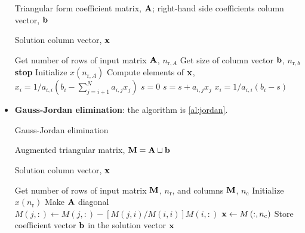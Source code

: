 \begin{itemize}
\begin{algorithm}
\begin{algorithmic}[1]
                \Input Triangular form coefficient matrix, $\boldsymbol{\mathrm{A}}$;
                right-hand side coefficients column vector, $\boldsymbol{\mathrm{b}}$

                \Output Solution column vector, $\boldsymbol{\mathrm{x}}$

                \State Get number of rows of input matrix $\boldsymbol{\mathrm{A}}$, $n_{\text{r},A}$ 
                \State Get size of column vector $\boldsymbol{\mathrm{b}}$, $n_{\text{r},b}$ 
                    \textbf{stop}
                \EndIf
                \State Initialize $x\left( n_{\text{r},A} \right)$
                    \Comment Compute elements of $\boldsymbol{\mathrm{x}}$, $x_i = 1/a_{i,i} \left( b_i - \sum_{j=i+1}^N a_{i,j} x_j \right)$
                    \State $s = 0$
                        \State  $s = s + a_{i,j} x_j$
                    \EndFor
                    \State  $x_i = 1/a_{i,i} \left( b_i - s \right)$
                \EndFor
                \EndProcedure
            \end{algorithmic}
        \end{algorithm}

    \item \textbf{Gauss-Jordan elimination}: the algorithm is \cref{al:jordan}.
        \begin{algorithm}
            \caption{Gauss-Jordan elimination}\label{al:jordan}
            \begin{algorithmic}[1]

                \Input Augmented triangular matrix, $\boldsymbol{\mathrm{M}} = \boldsymbol{\mathrm{A}} \sqcup \boldsymbol{\mathrm{b}}$

                \Output Solution column vector, $\boldsymbol{\mathrm{x}}$

                \State Get number of rows of input matrix $\boldsymbol{\mathrm{M}}$, $n_{\text{r}}$,
                and columns $\boldsymbol{\mathrm{M}}$, $n_{\text{c}}$ 
                \State Initialize $x\left( n_{\text{r}} \right)$
                    \Comment Make $\boldsymbol{\mathrm{A}}$ diagonal
                    \State  $M\left( j,: \right) \leftarrow M\left( j,: \right) - \left[ M\left( j,i \right) / M\left( i,i \right) \right] M\left( i,: \right)$
                    \EndFor
                \EndFor
                \State $\boldsymbol{\mathrm{x}} \leftarrow M\left( :, n_{\text{c}} \right)$
                \Comment Store coefficient vector $\boldsymbol{\mathrm{b}}$ in the solution vector $\boldsymbol{\mathrm{x}}$
                \EndProcedure
            \end{algorithmic}
        \end{algorithm}
\end{itemize}


